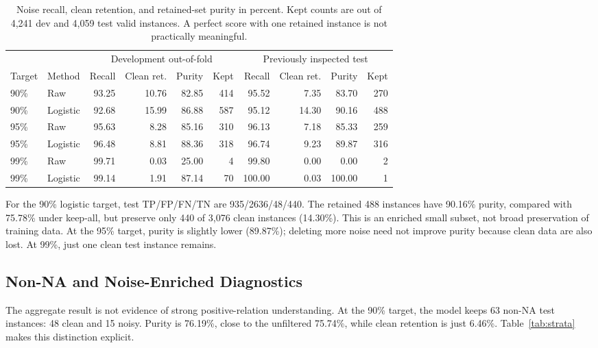 \documentclass[11pt]{article}
\begin{document}
\begin{table}[t]
\centering\small
\begin{tabular}{llrrrrrrrr}\toprule
&&\multicolumn{4}{c}{Development out-of-fold}&\multicolumn{4}{c}{Previously inspected test}\\
Target&Method&Recall&Clean ret.&Purity&Kept&Recall&Clean ret.&Purity&Kept\\\midrule
90\%&Raw&93.25&10.76&82.85&414&95.52&7.35&83.70&270\\
90\%&Logistic&92.68&15.99&86.88&587&95.12&14.30&90.16&488\\
95\%&Raw&95.63&8.28&85.16&310&96.13&7.18&85.33&259\\
95\%&Logistic&96.48&8.81&88.36&318&96.74&9.23&89.87&316\\
99\%&Raw&99.71&0.03&25.00&4&99.80&0.00&0.00&2\\
99\%&Logistic&99.14&1.91&87.14&70&100.00&0.03&100.00&1\\\bottomrule
\end{tabular}
\caption{Noise recall, clean retention, and retained-set purity in percent. Kept counts are out of 4,241 dev and 4,059 test valid instances. A perfect score with one retained instance is not practically meaningful.}\label{tab:frontier}
\end{table}

For the 90\% logistic target, test TP/FP/FN/TN are 935/2636/48/440. The retained 488 instances have 90.16\% purity, compared with 75.78\% under keep-all, but preserve only 440 of 3,076 clean instances (14.30\%). This is an enriched small subset, not broad preservation of training data. At the 95\% target, purity is slightly lower (89.87\%); deleting more noise need not improve purity because clean data are also lost. At 99\%, just one clean test instance remains.

\subsection{Non-NA and Noise-Enriched Diagnostics}
The aggregate result is not evidence of strong positive-relation understanding. At the 90\% target, the model keeps 63 non-NA test instances: 48 clean and 15 noisy. Purity is 76.19\%, close to the unfiltered 75.74\%, while clean retention is just 6.46\%. Table~\ref{tab:strata} makes this distinction explicit.
\end{document}
